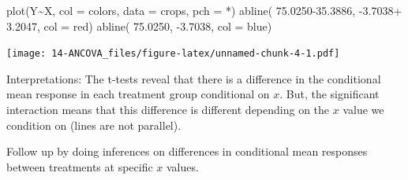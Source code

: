 \documentclass[
]{book}
\newenvironment{Shaded}{\begin{snugshade}}{\end{snugshade}}
\newcommand{\AttributeTok}[1]{\textcolor[rgb]{0.77,0.63,0.00}{#1}}
\newcommand{\FloatTok}[1]{\textcolor[rgb]{0.00,0.00,0.81}{#1}}
\newcommand{\FunctionTok}[1]{\textcolor[rgb]{0.00,0.00,0.00}{#1}}
\newcommand{\NormalTok}[1]{#1}
\newcommand{\SpecialCharTok}[1]{\textcolor[rgb]{0.00,0.00,0.00}{#1}}
\newcommand{\StringTok}[1]{\textcolor[rgb]{0.31,0.60,0.02}{#1}}
\begin{document}
\begin{Shaded}
\begin{Highlighting}[]
\FunctionTok{plot}\NormalTok{(Y}\SpecialCharTok{\textasciitilde{}}\NormalTok{X, }\AttributeTok{col =}\NormalTok{ colors, }\AttributeTok{data =}\NormalTok{ crops, }\AttributeTok{pch =} \StringTok{\textquotesingle{}*\textquotesingle{}}\NormalTok{)}
\FunctionTok{abline}\NormalTok{( }\FloatTok{75.0250{-}35.3886}\NormalTok{, }\SpecialCharTok{{-}}\FloatTok{3.7038}\SpecialCharTok{+} \FloatTok{3.2047}\NormalTok{, }\AttributeTok{col =} \StringTok{\textquotesingle{}red\textquotesingle{}}\NormalTok{)}
\FunctionTok{abline}\NormalTok{( }\FloatTok{75.0250}\NormalTok{, }\SpecialCharTok{{-}}\FloatTok{3.7038}\NormalTok{, }\AttributeTok{col =} \StringTok{\textquotesingle{}blue\textquotesingle{}}\NormalTok{)}
\end{Highlighting}
\end{Shaded}

\texttt{[image: 14-ANCOVA\_files/figure-latex/unnamed-chunk-4-1.pdf]}

Interpretations: The t-tests reveal that there is a difference in the conditional mean response in each treatment group conditional on \(x\). But, the significant interaction means that this difference is different depending on the \(x\) value we condition on (lines are not parallel).

Follow up by doing inferences on differences in conditional mean responses between treatments at specific \(x\) values.
\end{document}
